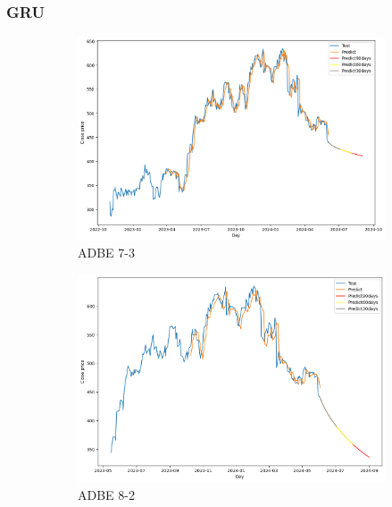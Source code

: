 \documentclass{ieeeojies}
\begin{document}
\subsubsection{GRU}
\begin{figure}[H]
    \centering
    \begin{subfigure}[b]{0.33\linewidth}
        \centering
        \includegraphics[width=\linewidth]{GRU Plot/GRU_ADBE_7_3.png}
        \caption{ADBE 7-3}
        \label{fig:adbe-7-3}
    \end{subfigure}%
    \hfill
    \begin{subfigure}[b]{0.33\linewidth}
        \centering
        \includegraphics[width=\linewidth]{GRU Plot/GRU_ADBE_8_2.png}
        \caption{ADBE 8-2}
        \label{fig:adbe-8-2}
    \end{subfigure}%
    \hfill
    \begin{subfigure}[b]{0.33\linewidth}

\end{subfigure}
\end{figure}
\end{document}
